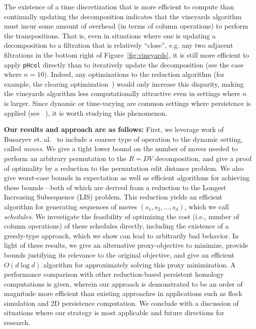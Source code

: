 \documentclass{siamart190516}
\begin{document}
  The existence of a time discretization that is more efficient to compute than continually updating the decomposition indicates that the vineyards algorithm must incur some amount of overhead (in terms of column operations) to perform the transpositions. That is, even in situations where one is updating a decomposition to a filtration that is  relatively ``close'', e.g. any two adjacent filtrations in the bottom right of Figure~\ref{fig:vineyards}, it is still more efficient to apply \texttt{pHcol} directly than  to iteratively update the decomposition (see the case where $n = 10$). 
 Indeed, any optimizations to the reduction algorithm (for example, the clearing optimization~\cite{chen2011persistent}) would only increase this disparity, making the vineyards algorithm less computationally attractive even in settings where $n$ is larger. Since dynamic or time-varying are common settings where persistence is applied (see ~\cite{topaz2015topological, xian2020capturing, lesnick2015interactive, kim2020spatiotemporal}), it is worth studying this phenomenon.
 
\textbf{Our results and approach are as follows:} First, we leverage work of Busaryev et. al.~\cite{busaryev2010tracking} to include a coarser type of operation to the dynamic setting, called \emph{moves}. We give a tight lower bound on the number of moves needed to perform an arbitrary permutation to the $R = D V$ decomposition, and give a proof of optimality by a reduction to the permutation edit distance problem.
We also give worst-case bounds in expectation as well as efficient algorithms for achieving these bounds---both of which are derived from a reduction to the Longest Increasing Subsequence (LIS) problem. 
This reduction yields an efficient algorithm for generating sequences of moves $( s_1, s_2, \dots, s_d )$, which we call \emph{schedules}. 
We investigate the feasibility of optimizing the cost 
(i.e., number of column operations) of these schedules directly, including the existence of a greedy-type approach, which we show can lead to arbitrarily bad behavior. 
In light of these results, we give an alternative proxy-objective to minimize, provide bounds justifying its relevance to the original objective, and give an efficient $O(d \log d)$ algorithm for approximately solving this proxy minimization. 
A performance comparison with other reduction-based persistent homology computations is given, wherein our approach is demonstrated to be an order of magnitude more efficient than existing approaches in applications such as flock simulation and 2D persistence computation. We conclude with a discussion of situations where our strategy is most applicable and future directions for research.  
   
\end{document}
